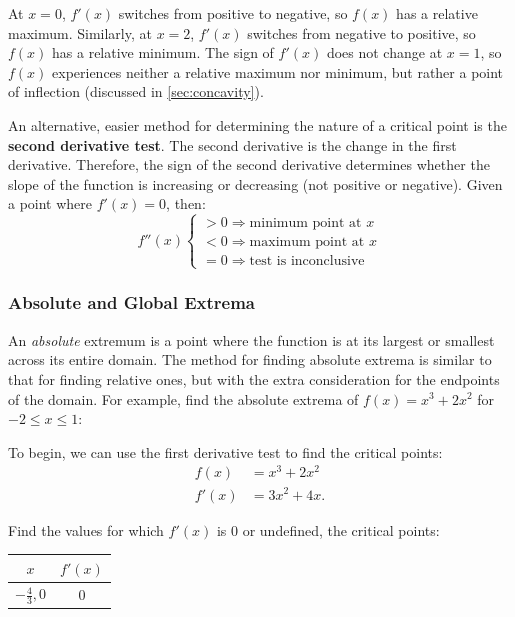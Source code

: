 \noindent At $x = 0$, $f'(x)$ switches from positive to negative, so $f(x)$ has a relative maximum. Similarly, at $x = 2$, $f'(x)$ switches from negative to positive, so $f(x)$ has a relative minimum. The sign of $f'(x)$ does not change at $x = 1$, so $f(x)$ experiences neither a relative maximum nor minimum, but rather a point of inflection (discussed in \ref{sec:concavity}).

An alternative, easier method for determining the nature of a critical point is the \textbf{second derivative test}. The second derivative is the change in the first derivative. Therefore, the sign of the second derivative determines whether the slope of the function is increasing or decreasing (not positive or negative). Given a point where $f'(x) = 0$, then:
\[ f''(x) \begin{cases}
	> 0 \Rightarrow \text{minimum point at } x \\
	< 0 \Rightarrow \text{maximum point at } x \\
	= 0 \Rightarrow \text{test is inconclusive}
\end{cases} \]

\subsubsection{Absolute and Global Extrema}
An \textit{absolute} extremum is a point where the function is at its largest or smallest across its entire domain. The method for finding absolute extrema is similar to that for finding relative ones, but with the extra consideration for the endpoints of the domain. For example, find the absolute extrema of $f(x) = x^3 + 2x^2$ for $-2 \leq x \leq 1$:

\noindent To begin, we can use the first derivative test to find the critical points:
\begin{align*}
	f(x) &= x^3 + 2x^2 \\
	f'(x) &= 3x^2 + 4x.
\end{align*}

\noindent Find the values for which $f'(x)$ is $0$ or undefined, the critical points:
\begin{table}[H]
	\centering
	\begin{tabular}{|c|c|}
		\hline
		$x$ & $f'(x)$ \\
		\hline \hline
		$-\frac{4}{3}, 0$ & $0$ \\
		\hline
	\end{tabular}
\end{table}

